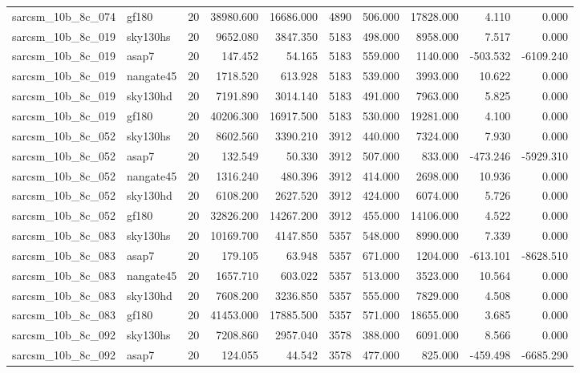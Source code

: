\begin{longtable}{llrrrrrrrr}
sarcsm\_10b\_8c\_074 & gf180 & 20 & 38980.600 & 16686.000 & 4890 & 506.000 & 17828.000 & 4.110 & 0.000 \\
sarcsm\_10b\_8c\_019 & sky130hs & 20 & 9652.080 & 3847.350 & 5183 & 498.000 & 8958.000 & 7.517 & 0.000 \\
sarcsm\_10b\_8c\_019 & asap7 & 20 & 147.452 & 54.165 & 5183 & 559.000 & 1140.000 & -503.532 & -6109.240 \\
sarcsm\_10b\_8c\_019 & nangate45 & 20 & 1718.520 & 613.928 & 5183 & 539.000 & 3993.000 & 10.622 & 0.000 \\
sarcsm\_10b\_8c\_019 & sky130hd & 20 & 7191.890 & 3014.140 & 5183 & 491.000 & 7963.000 & 5.825 & 0.000 \\
sarcsm\_10b\_8c\_019 & gf180 & 20 & 40206.300 & 16917.500 & 5183 & 530.000 & 19281.000 & 4.100 & 0.000 \\
sarcsm\_10b\_8c\_052 & sky130hs & 20 & 8602.560 & 3390.210 & 3912 & 440.000 & 7324.000 & 7.930 & 0.000 \\
sarcsm\_10b\_8c\_052 & asap7 & 20 & 132.549 & 50.330 & 3912 & 507.000 & 833.000 & -473.246 & -5929.310 \\
sarcsm\_10b\_8c\_052 & nangate45 & 20 & 1316.240 & 480.396 & 3912 & 414.000 & 2698.000 & 10.936 & 0.000 \\
sarcsm\_10b\_8c\_052 & sky130hd & 20 & 6108.200 & 2627.520 & 3912 & 424.000 & 6074.000 & 5.726 & 0.000 \\
sarcsm\_10b\_8c\_052 & gf180 & 20 & 32826.200 & 14267.200 & 3912 & 455.000 & 14106.000 & 4.522 & 0.000 \\
sarcsm\_10b\_8c\_083 & sky130hs & 20 & 10169.700 & 4147.850 & 5357 & 548.000 & 8990.000 & 7.339 & 0.000 \\
sarcsm\_10b\_8c\_083 & asap7 & 20 & 179.105 & 63.948 & 5357 & 671.000 & 1204.000 & -613.101 & -8628.510 \\
sarcsm\_10b\_8c\_083 & nangate45 & 20 & 1657.710 & 603.022 & 5357 & 513.000 & 3523.000 & 10.564 & 0.000 \\
sarcsm\_10b\_8c\_083 & sky130hd & 20 & 7608.200 & 3236.850 & 5357 & 555.000 & 7829.000 & 4.508 & 0.000 \\
sarcsm\_10b\_8c\_083 & gf180 & 20 & 41453.000 & 17885.500 & 5357 & 571.000 & 18655.000 & 3.685 & 0.000 \\
sarcsm\_10b\_8c\_092 & sky130hs & 20 & 7208.860 & 2957.040 & 3578 & 388.000 & 6091.000 & 8.566 & 0.000 \\
sarcsm\_10b\_8c\_092 & asap7 & 20 & 124.055 & 44.542 & 3578 & 477.000 & 825.000 & -459.498 & -6685.290 \\

\end{longtable}
